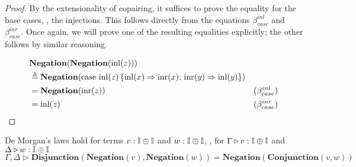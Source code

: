\begin{proof}
  By the extensionality of copairing, it suffices to prove the equality for the base cases, \ie, the injections. This follows directly from the equations \(\beta_{case}^{inl}\) and \(\beta_{case}^{inr}\). Once again, we will prove one of the resulting equalities explicitly; the other follows by similar reasoning.
  
    \begin{equation*}
    \begin{split}
       &\textbf{Negation} (\textbf{Negation} (\mathrm{inl}(z)) )  \\
        & \triangleq   \textbf{Negation} ( \text{case } \mathrm{inl}(z) \,
    \{\mathrm{inl}(x) 
        \Rightarrow \mathrm{inr}(x) ; \,
      \mathrm{inr}(y) \Rightarrow \mathrm{inl}(y)
    \}) \\
    & = \textbf{Negation}(\mathrm{inr}(z)) & (\beta_{case}^{inl}) \\
    & = \mathrm{inl}(z) & (\beta_{case}^{inr})
    \end{split} 
    \end{equation*}
\end{proof}

\begin{lemma} \label{lem:dmorgan} 
  De Morgan's laws hold for terms  $v: \mathbb{I} \oplus \mathbb{I}$ and $w: \mathbb{I} \oplus \mathbb{I}$, \ie, for $ \Gamma \triangleright v: \mathbb{I} \oplus \mathbb{I}$ and $ \Delta \triangleright w: \mathbb{I} \oplus \mathbb{I}$ 
  $$  \Gamma, \Delta \triangleright \textbf{Disjunction} (\textbf{Negation} (v) , \textbf{Negation} (w)) =  \textbf{Negation}(\textbf{Conjunction} (v, w)) $$ 
\end{lemma}

